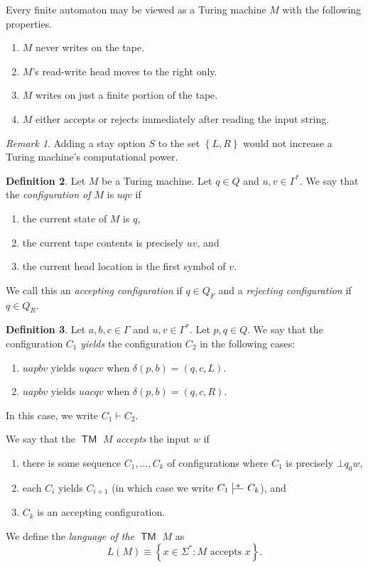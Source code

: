 \documentclass[10pt,letterpaper,cm]{nupset}
\theoremstyle{definition}
\newtheorem{definition}{Definition}[subsection]
\theoremstyle{theorem}
\theoremstyle{remark}
\newtheorem{remark}[definition]{Remark}
\def\ruleoffset{1pt}
\newcommand\specialvdash[2]{\mathrel{\ensurestackMath{
  \mkern2mu\rule[-\dp\strutbox]{.4pt}{\baselineskip}\stackon[\ruleoffset]{
    \stackunder[\dimexpr\ruleoffset-.4\ht\strutbox+.4\dp\strutbox]{
      \rule[\dimexpr.4\ht\strutbox-.4\dp\strutbox]{2.5ex}{.4pt}}{
        \scriptstyle #1}}{\scriptstyle#2}\mkern2mu}}
}
\newcommand{\1}{\mathbf{1}}
\newcommand{\0}{\vec 0}
\DeclareMathOperator{\TM}{\mathsf{TM}}
\begin{document}
Every finite automaton may be viewed as a Turing machine $M$ with the following properties. 
\begin{enumerate}[label=(\alph*)]
\item $M$ never writes on the tape.
\item $M$'s read-write head moves to the right only.
\item $M$ writes on just a finite portion of the tape.
\item $M$ either accepts or rejects immediately after reading the input string. 
\end{enumerate}


\begin{remark}
Adding a stay option $S$ to the set $\left\{L, R\right\}$ would not increase a Turing machine's computational power.
\end{remark}

\begin{definition}
Let $M$ be a Turing machine. Let $q\in Q$ and $u,v\in \Gamma^{\ast}$. We say that the \textit{configuration of $M$} is $uqv$ if 
\begin{enumerate}[label=(\alph*)]
\item the current state of $M$ is $q$,
\item the current tape contents is precisely $uv$, and
\item the current head location is the first symbol of $v$.
\end{enumerate}
We call this an \textit{accepting configuration} if $q \in Q_F$ and a \textit{rejecting configuration} if $q \in Q_R$.
\end{definition}

\begin{definition}
Let $a,b,c\in \Gamma$ and $u,v\in \Gamma^{\ast}$. Let $p,q\in Q$. We say that the configuration $C_1$ \textit{yields} the configuration $C_2$ in the following cases:
\begin{enumerate}[label=(\alph*)]
\item $uapbv$ yields $uqacv$ when $\delta(p,b) = \left(q, c, L\right)$.
\item $uapbv$ yields $uacqv$ when $\delta(p, b) = \left(q, c, R\right)$. 
\end{enumerate}
In this case, we write $C_1 \vdash C_2$.
\end{definition}

\medskip

We say that the $\TM$ $M$ \textit{accepts} the input $w$ if 
\begin{enumerate}[label=(\roman*)]
\item there is some sequence $C_1, \ldots, C_k$ of configurations where $C_1$ is precisely  $\bot q_0w$, 
\item each $C_i$ yields $C_{i+1}$ (in which case we write $C_1 \specialvdash{}{*} C_k$), and
\item $C_k$ is an accepting configuration. 
\end{enumerate}
We define the \textit{language of the $\TM$ $M$} as $$L(M) \equiv \left\{x \in \Sigma^{\ast}: M \text{ accepts } x \right\}.$$
\end{document}
